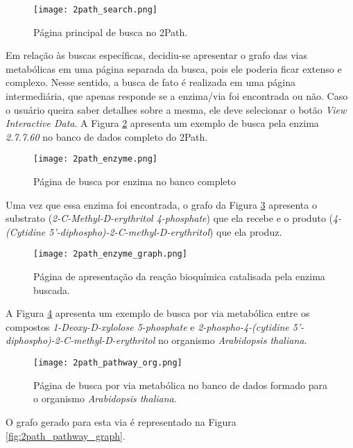 \begin{figure}[!h]
    \centering
    \texttt{[image: 2path\_search.png]}
    \caption{Página principal de busca no 2Path.}
    \label{fig:2path_search}
\end{figure}

\indent Em relação às buscas específicas, decidiu-se apresentar o grafo das vias metabólicas em uma página separada da busca, pois ele poderia ficar extenso e complexo. Nesse sentido, a busca de fato é realizada em uma página intermediária, que apenas responde se a enzima/via foi encontrada ou não. Caso o usuário queira saber detalhes sobre a mesma, ele deve selecionar o botão \textit{View Interactive Data}. A Figura \ref{fig:2path_enzyme} apresenta um exemplo de busca pela enzima \textit{2.7.7.60} no banco de dados completo do 2Path.

\begin{figure}[!h]
    \centering
    \texttt{[image: 2path\_enzyme.png]}
    \caption{Página de busca por enzima no banco completo}
    \label{fig:2path_enzyme}
\end{figure}

\indent Uma vez que essa enzima foi encontrada, o grafo da Figura \ref{fig:2path_enzyme_graph} apresenta o substrato (\textit{2-C-Methyl-D-erythritol 4-phosphate}) que ela recebe e o produto (\textit{4-(Cytidine 5'-diphospho)-2-C-methyl-D-erythritol}) que ela produz. 

\begin{figure}[!h]
    \centering
    \texttt{[image: 2path\_enzyme\_graph.png]}
    \caption{Página de apresentação da reação bioquímica catalisada pela enzima buscada.}
    \label{fig:2path_enzyme_graph}
\end{figure}

\indent A Figura \ref{fig:2path_pathway_org} apresenta um exemplo de busca por via metabólica entre os compostos \textit{1-Deoxy-D-xylolose 5-phosphate} e \textit{2-phospho-4-(cytidine 5'-diphospho)-2-C-methyl-D-erythritol} no organismo \textit{Arabidopsis thaliana}.

\begin{figure}[!h]
    \centering
    \texttt{[image: 2path\_pathway\_org.png]}
    \caption{Página de busca por via metabólica no banco de dados formado para o organismo \textit{Arabidopsis thaliana}.}
    \label{fig:2path_pathway_org}
\end{figure}

\indent O grafo gerado para esta via é representado na Figura \ref{fig:2path_pathway_graph}.

